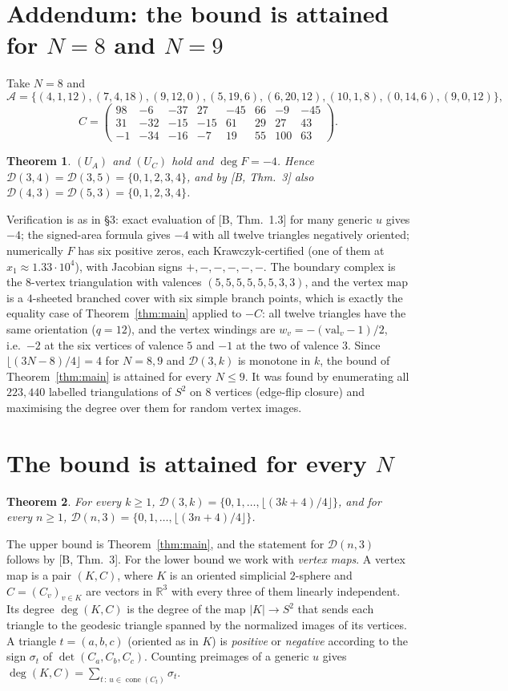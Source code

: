 \documentclass[11pt]{amsart}
\newtheorem{theorem}{Theorem}
\theoremstyle{remark}
\newcommand{\A}{\mathcal A}
\begin{document}
\section{Addendum: the bound is attained for \texorpdfstring{$N=8$ and $N=9$}{N=8 and N=9}}
Take $N=8$ and
\[
\A=\{(4,1,12),(7,4,18),(9,12,0),(5,19,6),(6,20,12),(10,1,8),(0,14,6),(9,0,12)\},
\]
\[
C=\begin{pmatrix}
98&-6&-37&27&-45&66&-9&-45\\
31&-32&-15&-15&61&29&27&43\\
-1&-34&-16&-7&19&55&100&63
\end{pmatrix}.
\]
\begin{theorem}
$(U_A)$ and $(U_C)$ hold and $\deg F=-4$. Hence $\mathcal D(3,4)=\mathcal D(3,5)=\{0,1,2,3,4\}$, and by [B, Thm.~3] also $\mathcal D(4,3)=\mathcal D(5,3)=\{0,1,2,3,4\}$.
\end{theorem}
Verification is as in \S3: exact evaluation of [B, Thm.~1.3] for many generic $u$ gives $-4$; the signed-area formula gives $-4$ with all twelve triangles negatively oriented; numerically $F$ has six positive zeros, each Krawczyk-certified (one of them at $x_1\approx1.33\cdot10^4$), with Jacobian signs $+,-,-,-,-,-$.
The boundary complex is the $8$-vertex triangulation with valences $(5,5,5,5,5,5,3,3)$, and the vertex map is a $4$-sheeted branched cover with six simple branch points, which is exactly the equality case of Theorem~\ref{thm:main} applied to $-C$: all twelve triangles have the same orientation ($q=12$), and the vertex windings are $w_v=-(\mathrm{val}_v-1)/2$, i.e.\ $-2$ at the six vertices of valence $5$ and $-1$ at the two of valence $3$.
Since $\lfloor(3N-8)/4\rfloor=4$ for $N=8,9$ and $\mathcal D(3,k)$ is monotone in $k$, the bound of Theorem~\ref{thm:main} is attained for every $N\le9$. It was found by enumerating all $223{,}440$ labelled triangulations of $S^2$ on $8$ vertices (edge-flip closure) and maximising the degree over them for random vertex images.


\section{The bound is attained for every \texorpdfstring{$N$}{N}}
\begin{theorem}\label{thm:all}
For every $k\ge1$, $\mathcal D(3,k)=\{0,1,\dots,\lfloor(3k+4)/4\rfloor\}$, and for every $n\ge1$, $\mathcal D(n,3)=\{0,1,\dots,\lfloor(3n+4)/4\rfloor\}$.
\end{theorem}
The upper bound is Theorem~\ref{thm:main}, and the statement for $\mathcal D(n,3)$ follows by [B, Thm.~3].
For the lower bound we work with \emph{vertex maps}.
A vertex map is a pair $(K,C)$, where $K$ is an oriented simplicial $2$-sphere and $C=(C_v)_{v\in K}$ are vectors in $\mathbb R^3$ with every three of them linearly independent.
Its degree $\deg(K,C)$ is the degree of the map $|K|\to S^2$ that sends each triangle to the geodesic triangle spanned by the normalized images of its vertices.
A triangle $t=(a,b,c)$ (oriented as in $K$) is \emph{positive} or \emph{negative} according to the sign $\sigma_t$ of $\det(C_a,C_b,C_c)$.
Counting preimages of a generic $u$ gives $\deg(K,C)=\sum_{t\,:\,u\in\operatorname{cone}(C_t)}\sigma_t$.
\end{document}
